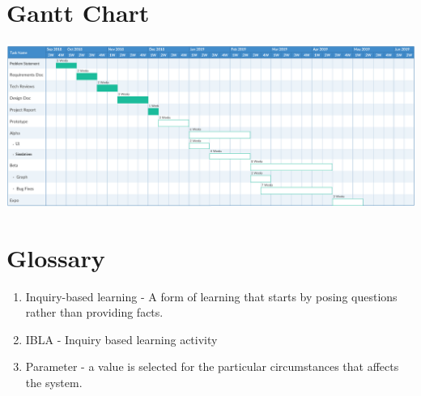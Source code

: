 \documentclass[onecolumn, draftclsnofoot,10pt, compsoc]{IEEEtran}
\begin{document}
\section{Gantt Chart}
\includegraphics[width=\textwidth]{GanttChart1.png}

\section{Glossary}
\begin{enumerate}
    \item Inquiry-based learning - A form of learning that starts by posing questions rather than providing facts.
    \item IBLA - Inquiry based learning activity
    \item Parameter - a value is selected for the particular circumstances that affects the system. 

\end{enumerate}
\end{document}
